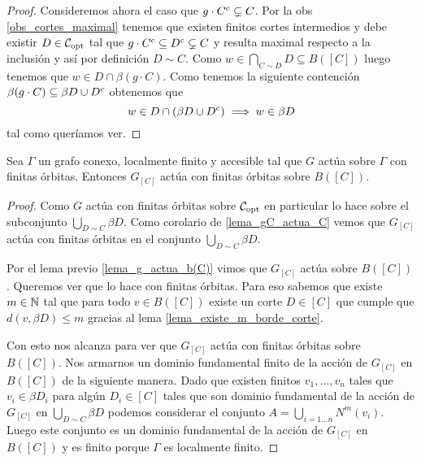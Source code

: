\documentclass[tesis.tex]{subfiles}
\begin{document}
\begin{proof}
	Consideremos ahora el caso que ${g \cdot C^{c}} \subsetneq C$.
	Por la obs \ref{obs_cortes_maximal} tenemos que existen finitos cortes intermedios y debe existir $D \in {\cal C}_{\text{opt}}$ tal que 
	$g \cdot C^{c}  \subseteq D^{c} \subsetneq C$ y resulta maximal respecto a la inclusión y así por definición $D \sim C$.
	Como $w \in \bigcap_{C \sim D} D  \subseteq B([C])$ luego tenemos que 
	$w \in D \cap \beta (g \cdot C)$.
	Como tenemos la siguiente contención $\beta (g \cdot C) \subseteq \beta D \cup D^{c}$ obtenemos que
	\[
	w \in D \cap (\beta D \cup D^{c}) \implies w \in \beta D
	\]
	tal como queríamos ver.
\end{proof}


\begin{lema}\label{lema_accion_b(C)}
	Sea $\Gamma$ un grafo conexo, localmente finito y accesible tal que $G$ actúa sobre $\Gamma$ con finitas órbitas.
	Entonces $G_{[C]}$ actúa con finitas órbitas sobre $B([C])$.
\end{lema}
\begin{proof}
	Como $G$ actúa con finitas órbitas sobre ${\cal C}_{\text{opt}}$ en particular lo hace sobre el subconjunto $\bigcup_{D \sim C} \beta D$.
	Como corolario de \ref{lema_gC_actua_C} vemos que $G_{[C]}$ actúa con finitas órbitas en el conjunto $ \bigcup_{D \sim C} \beta D $.
	
	Por el lema previo \ref{lema_g_actua_b(C)} vimos que $G_{[C]}$ actúa sobre $B([C])$.
	Queremos ver que lo hace con finitas órbitas.
	Para eso sabemos que existe $m \in \mathbb{N}$ tal que para todo $v \in B([C])$ existe un corte $D \in [C]$ que cumple que
	$d(v,\beta D) \le m$ gracias al lema \ref{lema_existe_m_borde_corte}.
	
	Con esto nos alcanza para ver que $G_{[C]}$ actúa con finitas órbitas sobre $B([C])$.
	Nos armarnos un dominio fundamental finito de la acción de $G_{[C]}$ en $B([C])$ de la siguiente manera.
	Dado que existen finitos $v_{1}, \dots, v_{n}$ tales que $v_{i} \in \beta D_{i}$ para algún $D_{i} \in [C]$ tales que son dominio fundamental de la acción de $G_{[C]}$ en $\bigcup_{D \sim C} \beta D$ podemos considerar el conjunto 
	$A  = \bigcup_{i=1 \dots n} N^m(v_{i})$. 
	Luego este conjunto es un dominio fundamental de la acción de $G_{[C]}$ en $B([C])$ y es finito porque $\Gamma$ es localmente finito.
\end{proof}
\end{document}
